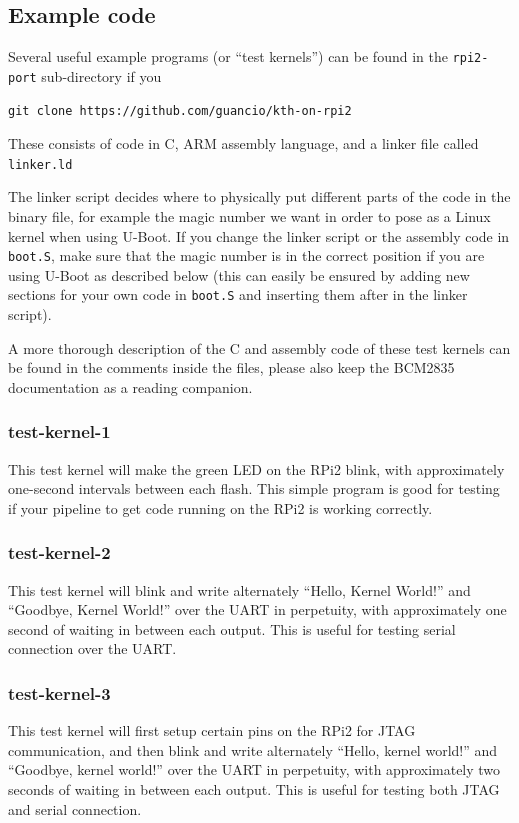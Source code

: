 \documentclass[a4paper,11pt,reqno]{amsart}
\begin{document}
{\subsection{Example code}
Several useful example programs (or ``test kernels'') can be found in the \texttt{rpi2-port} sub-directory if you

\begin{verbatim}
git clone https://github.com/guancio/kth-on-rpi2
\end{verbatim}

These consists of code in C, ARM assembly language, and a linker file called \texttt{linker.ld}

The linker script decides where to physically put different parts of the code in the binary file, for example the magic number we want in order to pose as a Linux kernel when using U-Boot. If you change the linker script or the assembly code in \texttt{boot.S}, make sure that the magic number is in the correct position if you are using U-Boot as described below (this can easily be ensured by adding new sections for your own code in \texttt{boot.S} and inserting them after  in the linker script).

A more thorough description of the C and assembly code of these test kernels can be found in the comments inside the files, please also keep the BCM2835 documentation as a reading companion.

\subsubsection{test-kernel-1}
This test kernel will make the green LED on the RPi2 blink, with approximately one-second intervals between each flash. This simple program is good for testing if your pipeline to get code running on the RPi2 is working correctly.

\subsubsection{test-kernel-2}
This test kernel will blink and write alternately ``Hello, Kernel World!'' and ``Goodbye, Kernel World!'' over the UART in perpetuity, with approximately one second of waiting in between each output. This is useful for testing serial connection over the UART.

\subsubsection{test-kernel-3}
This test kernel will first setup certain pins on the RPi2 for JTAG communication, and then blink and write alternately ``Hello, kernel world!'' and ``Goodbye, kernel world!'' over the UART in perpetuity, with approximately two seconds of waiting in between each output. This is useful for testing both JTAG and serial connection.

}
\end{document}
